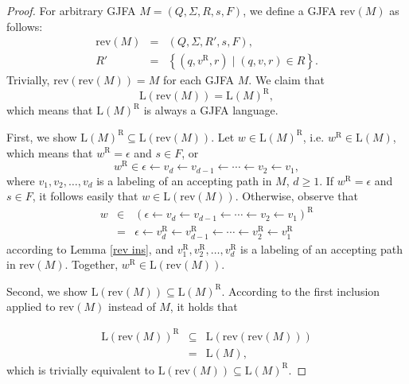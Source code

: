 \documentclass{ws-ijmpc}
\begin{document}
\begin{proof}
For arbitrary GJFA $M=\left(Q,\Sigma,R,s,F\right)$, we define a GJFA
$\mathrm{rev}\!\left(M\right)$ as follows: 
\begin{eqnarray*}
\mathrm{rev}\!\left(M\right) & = & \left(Q,\Sigma,R',s,F\right),\\
R' & = & \left\{ \left(q,v^{\mathrm{R}},r\right)\mid\left(q,v,r\right)\in R\right\} .
\end{eqnarray*}
Trivially, $\mathrm{rev}\!\left(\mathrm{rev}\!\left(M\right)\right)=M$
for each GJFA $M$. We claim that 
\[
\mathrm{L}\!\left(\mathrm{rev}\!\left(M\right)\right)=\mathrm{L}\!\left(M\right)^{\mathrm{R}},
\]
which means that $\mathrm{L}\!\left(M\right)^{\mathrm{R}}$ is always
a GJFA language.

First, we show $\mathrm{L}\!\left(M\right)^{\mathrm{R}}\subseteq\mathrm{L}\!\left(\mathrm{rev}\!\left(M\right)\right)$.
Let $w\in\mathrm{L}\!\left(M\right)^{\mathrm{R}}$, i.e. $w^{\mathrm{R}}\in\mathrm{L}\!\left(M\right)$,
which means that $w^{\mathrm{R}}=\epsilon$ and $s\in F$, or 
\begin{equation}
w^{\mathrm{R}}\in\epsilon\leftarrow v_{d}\leftarrow v_{d-1}\leftarrow\cdots\leftarrow v_{2}\leftarrow v_{1},\label{eq:comp-2}
\end{equation}
where $v_{1},v_{2},\dots,v_{d}$ is a labeling of an accepting path
in $M$, $d\ge1$. If $w^{\mathrm{R}}=\epsilon$ and $s\in F$, it
follows easily that $w\in\mathrm{L}\!\left(\mathrm{rev}\!\left(M\right)\right)$.
Otherwise, observe that 
\begin{eqnarray*}
w & \in & \left(\epsilon\leftarrow v_{d}\leftarrow v_{d-1}\leftarrow\cdots\leftarrow v_{2}\leftarrow v_{1}\right)^{\mathrm{R}}\\
 & = & \epsilon\leftarrow v_{d}^{\mathrm{R}}\leftarrow v_{d-1}^{\mathrm{R}}\leftarrow\cdots\leftarrow v_{2}^{\mathrm{R}}\leftarrow v_{1}^{\mathrm{R}}
\end{eqnarray*}
according to Lemma \ref{rev ins}, and $v_{1}^{\mathrm{R}},v_{2}^{\mathrm{R}},\dots,v_{d}^{\mathrm{R}}$
is a labeling of an accepting path in $\mathrm{rev}\!\left(M\right)$.
Together, $w^{\mathrm{R}}\in\mathrm{L}\!\left(\mathrm{rev}\!\left(M\right)\right)$. 

Second, we show $\mathrm{L}\!\left(\mathrm{rev}\!\left(M\right)\right)\subseteq\mathrm{L}\!\left(M\right)^{\mathrm{R}}$.
According to the first inclusion applied to $\mathrm{rev}\!\left(M\right)$
instead of $M$, it holds that

\begin{eqnarray*}
\mathrm{L}\!\left(\mathrm{rev}\!\left(M\right)\right)^{\mathrm{R}} & \subseteq & \mathrm{L}\!\left(\mathrm{rev}\!\left(\mathrm{rev}\!\left(M\right)\right)\right)\\
 & = & \mathrm{L}\!\left(M\right),
\end{eqnarray*}
which is trivially equivalent to $\mathrm{L}\!\left(\mathrm{rev}\!\left(M\right)\right)\subseteq\mathrm{L}\!\left(M\right)^{\mathrm{R}}$.
\end{proof}
\end{document}
